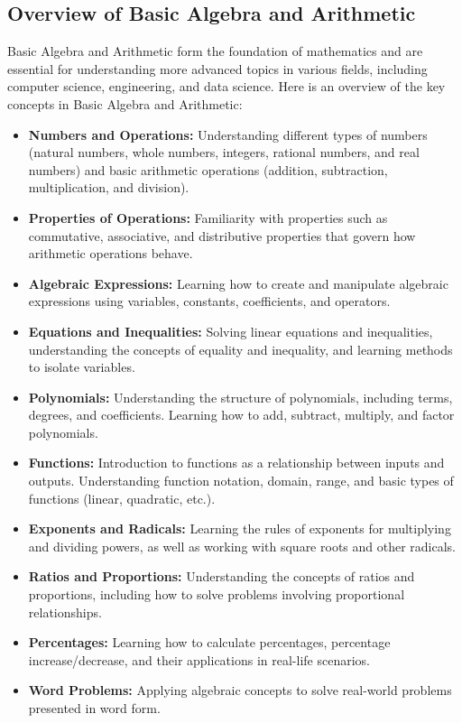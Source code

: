\documentclass[openany]{book}
\begin{document}
\subsection{Overview of Basic Algebra and Arithmetic}
Basic Algebra and Arithmetic form the foundation of mathematics and are essential for understanding more advanced topics in various fields, including computer science, engineering, and data science. Here is an overview of the key concepts in Basic Algebra and Arithmetic:
\begin{itemize}
    \item \textbf{Numbers and Operations:} Understanding different types of numbers (natural numbers, whole numbers, integers, rational numbers, and real numbers) and basic arithmetic operations (addition, subtraction, multiplication, and division).
    \item \textbf{Properties of Operations:} Familiarity with properties such as commutative, associative, and distributive properties that govern how arithmetic operations behave.
    \item \textbf{Algebraic Expressions:} Learning how to create and manipulate algebraic expressions using variables, constants, coefficients, and operators.
    \item \textbf{Equations and Inequalities:} Solving linear equations and inequalities, understanding the concepts of equality and inequality, and learning methods to isolate variables.
    \item \textbf{Polynomials:} Understanding the structure of polynomials, including terms, degrees, and coefficients. Learning how to add, subtract, multiply, and factor polynomials.
    \item \textbf{Functions:} Introduction to functions as a relationship between inputs and outputs. Understanding function notation, domain, range, and basic types of functions (linear, quadratic, etc.).
    \item \textbf{Exponents and Radicals:} Learning the rules of exponents for multiplying and dividing powers, as well as working with square roots and other radicals.
    \item \textbf{Ratios and Proportions:} Understanding the concepts of ratios and proportions, including how to solve problems involving proportional relationships.
    \item \textbf{Percentages:} Learning how to calculate percentages, percentage increase/decrease, and their applications in real-life scenarios.
    \item \textbf{Word Problems:} Applying algebraic concepts to solve real-world problems presented in word form.
\end{itemize}
\end{document}
